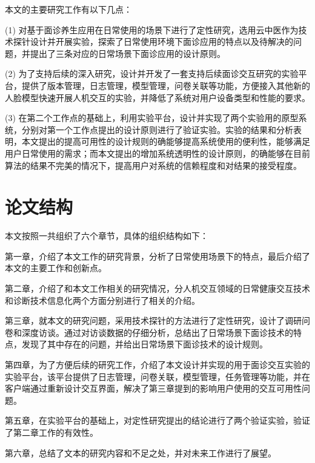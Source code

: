 本文的主要研究工作有以下几点：

(1) 对基于面诊养生应用在日常使用的场景下进行了定性研究，选用云中医作为技术探针设计并开展实验，探索了日常使用环境下面诊应用的特点以及待解决的问题，并提出了三条对应的日常场景下面诊应用的设计原则。

(2) 为了支持后续的深入研究，设计并开发了一套支持后续面诊交互研究的实验平台，提供了版本管理，日志管理，模型管理，问卷关联等功能，方便接入其他新的人脸模型快速开展人机交互的实验，并降低了系统对用户设备类型和性能的要求。

(3) 在第二个工作点的基础上，利用实验平台，设计并实现了两个实验用的原型系统，分别对第一个工作点提出的设计原则进行了验证实验。实验的结果和分析表明，本文提出的提高可用性的设计规则的确能够提高系统使用的便利性，能够满足用户日常使用的需求；而本文提出的增加系统透明性的设计原则，的确能够在目前算法的结果不完美的情况下，提高用户对系统的信赖程度和对结果的接受程度。














\section{论文结构}
本文按照一共组织了六个章节，具体的组织结构如下：

第一章，介绍了本文工作的研究背景，分析了日常使用场景下的特点，最后介绍了本文的主要工作和创新点。

第二章，介绍了和本文工作相关的研究情况，分人机交互领域的日常健康交互技术和诊断技术信息化两个方面分别进行了相关的介绍。

第三章，就本文的研究问题，采用技术探针的方法进行了定性研究，设计了调研问卷和深度访谈。通过对访谈数据的仔细分析，总结出了日常场景下面诊技术的特点，发现了其中存在的问题，并给出日常场景下面诊技术的设计规则。

第四章，为了方便后续的研究工作，介绍了本文设计并实现的用于面诊交互实验的实验平台，该平台提供了日志管理，问卷关联，模型管理，任务管理等功能，并在客户端通过重新设计交互界面，解决了第三章提到的影响用户使用的交互可用性问题。

第五章，在实验平台的基础上，对定性研究提出的结论进行了两个验证实验，验证了第二章工作的有效性。

第六章，总结了文本的研究内容和不足之处，并对未来工作进行了展望。